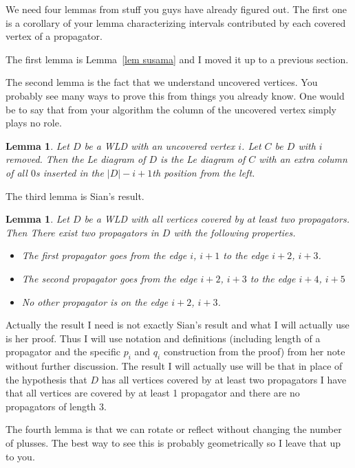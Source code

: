 \documentclass[11pt]{article}
\newtheorem{lem}[thm]{Lemma}
\theoremstyle{remark}
\theoremstyle{definition}
\begin{document}
We need four lemmas from stuff you guys have already figured out.  The first one is a corollary of your lemma characterizing intervals contributed by each covered vertex of a propagator.

The first lemma is Lemma~\ref{lem susama} and I moved it up to a previous section.

The second lemma is the fact that we understand uncovered vertices.  You probably see many ways to prove this from things you already know.  One would be to say that from your algorithm the column of the uncovered vertex simply plays no role.

\begin{lem}\label{lem uncovered}
  Let $D$ be a WLD with an uncovered vertex $i$.  Let $C$ be $D$ with $i$ removed.  Then the Le diagram of $D$ is the Le diagram of $C$ with an extra column of all $0$s inserted in the $|D|-i+1$th position from the left.
\end{lem}

The third lemma is Sian's result.

\begin{lem}\label{lem sian}
  Let $D$ be a WLD with all vertices covered by at least two propagators.  Then There exist two propagators in $D$ with the following properties.
  \begin{itemize}
  \item The first propagator goes from the edge $i$, $i+1$ to the edge $i+2$, $i+3$.
  \item The second propagator goes from the edge $i+2$, $i+3$ to the edge $i+4$, $i+5$
  \item No other propagator is on the edge $i+2$, $i+3$.
  \end{itemize}
\end{lem}

Actually the result I need is not exactly Sian's result and what I will actually use is her proof.  Thus I will use notation and definitions (including length of a propagator and the specific $p_i$ and $q_i$ construction from the proof) from her note without further discussion.  The result I will actually use will be that in place of the hypothesis that $D$ has all vertices covered by at least two propagators I have that all vertices are covered by at least 1 propagator and there are no propagators of length 3.

The fourth lemma is that we can rotate or reflect without changing the number of plusses.  The best way to see this is probably geometrically so I leave that up to you.
\end{document}
